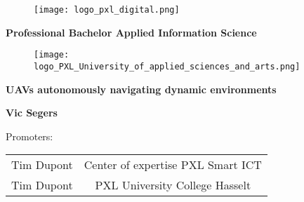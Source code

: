 \begin{titlepage}
  \color{pxlgreen}
  \begin{figure}
    \centering
    \texttt{[image: logo\_pxl\_digital.png]}
  \end{figure}
  \vspace{\baselineskip}
  \begin{center}
    \LARGE\textbf{\textcolor{pxlgreen}{Professional Bachelor Applied Information Science}}
  \end{center}
  \vspace{\baselineskip}
  \begin{figure}[h]
    \centering
    \texttt{[image: logo\_PXL\_University\_of\_applied\_sciences\_and\_arts.png]}
  \end{figure}
  \begin{center}
    \Huge\textbf{\textcolor{pxlgreen}{UAVs autonomously navigating dynamic environments}}
  \end{center}
  \vspace{\baselineskip}
  \begin{center}
    \Large\textbf{\textcolor{pxlgreen}{Vic Segers}}
  \end{center}
  \vspace{\baselineskip}
  \begin{center}
    \large\textcolor{pxlgreen}{Promoters:}
  \end{center}
  \begin{tabularx}{\textwidth}{C C}
    Tim Dupont & Center of expertise PXL Smart ICT\\
    Tim Dupont & PXL University College Hasselt
  \end{tabularx}
\end{titlepage}